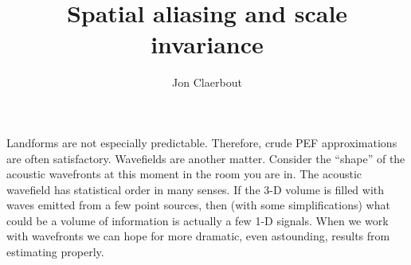 
\title{Spatial aliasing and scale invariance}
\author{Jon Claerbout}
\maketitle
\label{paper:lal}


\par
Landforms are not especially predictable.
Therefore, crude PEF approximations are often satisfactory.
Wavefields are another matter.
Consider the ``shape'' of the acoustic wavefronts
at this moment in the room you are in.
The acoustic wavefield has statistical order in many senses.
If the 3-D volume is filled with waves emitted from a few point sources,
then (with some simplifications)
what could be a volume of information is actually a few 1-D signals.
When we work with wavefronts we can hope for more dramatic,
even astounding, results from estimating properly.


